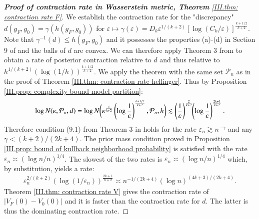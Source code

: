 \begin{proof}[\hypertarget{III.proof contraction wasserstein}{\textbf{Proof of contraction rate in Wasserstein metric, Theorem} \ref{III.thm: contraction rate F}}]
    We establish the contraction rate for the "discrepancy" $d(g_{\scriptscriptstyle{F}},g_0)=\gamma(h(g_{\scriptscriptstyle{F}},g_0))$ for $\varepsilon \mapsto \gamma(\varepsilon) = D_k \varepsilon^{1/(k+2)}[\log{(C_k/\varepsilon)}]^{\frac{k+1/2}{k+2}}$. Note that $\gamma^{-1} (d) \leq h(g_{\scriptscriptstyle{F}},g_0)$ and it possesses the properties (a)-(d) in Section 9 of \cite{25} and the balls of $d$ are convex. We can therefore apply Theorem 3 from \cite{25} to obtain a rate of posterior contraction relative to $d$ and thus relative to $ h^{1/(k+2)} (\log(1/h))^{\frac{k+1/2}{k+2}}$. We apply the theorem with the same set $\mathcal{P}_n$  as in the proof of Theorem \ref{III.thm: contraction rate hellinger}. Thus by Proposition \ref{III.prop: complexity bound model partition}:
   \begin{align*}
       \log{N(\varepsilon, \mathcal{P}_n, d)} = \log{N \bigg(\varepsilon^{\frac{1}{k+2}} \left( \log{\frac{1}{\varepsilon}} \right)^{\frac{k+1/2}{k+2}}, \mathcal{P}_n, h \bigg)} \lesssim \left( \frac{1}{\varepsilon}\right)^{\frac{2}{k+2}} \hspace{-0.1cm} \left( \log{\frac{1}{\varepsilon}} \right)^{\frac{2k+1}{k+2}}.
   \end{align*}
   Therefore condition (9.1) from Theorem 3 in \cite{25} holds for the rate $\varepsilon_n \gtrsim n^{-\gamma}$ and any $\gamma < (k+2)/(2k+4)$. The prior mass condition proved in Proposition \ref{III.prop: bound of kullback neighborhood probability} is satisfied with the rate $\varepsilon_n \asymp (\log n/n)^{1/4}$. The slowest of the two rates is $ \varepsilon_n \asymp (\log n/n)^{1/4}$ which, by substitution, yields a rate:
   \begin{align*}
       \varepsilon_n^{2/(k+2)} (\log{(1/\varepsilon_n)} )^{\frac{2k+1}{k+2}} \asymp n^{-1 /(2 k + 4)}(\log n)^{(4k +3)/(2k+4)}.
   \end{align*}
Theorem \ref{III.thm: contraction rate V} gives the contraction rate of $|V_{\scriptscriptstyle{F}}(0) - V_0(0)|$ and it is faster than the contraction rate for $d$. The latter is thus the dominating contraction rate. 
\end{proof}

